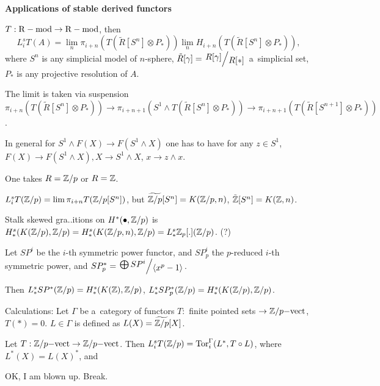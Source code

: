 



    {\bf Applications of stable derived functors}
    
    \begin{theorem}
        $T:\mathrm{R-mod} \to \mathrm{R-mod}$, then 
        $$L_i^sT(A) = \lim_n \pi_{i+n}(T(\tilde{R}[S^n] \otimes P_\ast))
        \lim_n H_{i+n}(T(\tilde{R}[S^n] \otimes P_\ast)),$$
        where $S^n$ is any simplicial model of $n$-sphere,
        $\tilde{R}[\gamma] = \bigslant{R[\gamma]}{R[\ast]}$ a~simplicial set,
        $P_\ast$ is any projective resolution of $A$.
        
        The limit is taken via suspension
        $\pi_{i+n}(T(\tilde{R}[S^n] \otimes P_\ast)) 
        \to \pi_{i+n+1}(S^1 \wedge T(\tilde{R}[S^n] \otimes P_\ast))
        \to \pi_{i+n+1}(T(\tilde{R}[S^{n+1}] \otimes P_\ast))$.
    \end{theorem}
        
    In general for $S^1 \wedge F(X) \to F(S^1 \wedge X)$
    one has to have for any $z \in S^1$,
    $F(X) \to F(S^1 \wedge X), X \to S^1 \wedge X$, $x \to z \wedge x$.
    
    One takes $R = {\mathbb{Z}} / p$ or $R = {\mathbb{Z}}$.
    
    $L_i^sT({\mathbb{Z}}/p) = \lim \pi_{i+n} T({\mathbb{Z}}/p [S^n])$,
    but $\widetilde{{\mathbb{Z}}/p}[S^n] = K({\mathbb{Z}}/p,n)$,
    $\tilde{{\mathbb{Z}}}[S^n] = K({\mathbb{Z}}, n)$.
    
    Stalk skewed gra..itions on $H^\ast(\bullet, {\mathbb{Z}}/p)$
    is $H_\ast^s(K({\mathbb{Z}}/p),{\mathbb{Z}}/p) 
    = H_\ast^s(K({\mathbb{Z}}/p,n),{\mathbb{Z}}/p)
    = L_\ast^s {\mathbb{Z}}_p[.]({\mathbb{Z}}/p)$. (?)
    
    \begin{theorem}
        Let $SP^i$ be the $i$-th symmetric power functor,
        and $SP^i_p$ the $p$-reduced $i$-th symmetric power,
        and $SP^\ast_p = \bigslant{\bigoplus SP^i}{\langle x^p - 1 \rangle}$.
        
        Then $L_\ast^s SP^\ast({\mathbb{Z}}/p) = H_\ast^s(K({\mathbb{Z}}),{\mathbb{Z}}/p)$,
        $L_\ast^s SP_p^\ast({\mathbb{Z}}/p) = H_\ast^s(K({\mathbb{Z}}/p),{\mathbb{Z}}/p)$.
    \end{theorem}
    
    Calculations: Let $\Gamma$ be a~category of functors 
    $T:$ finite pointed sets $\to {\mathbb{Z}}/p{\mathrm{-vect}}$,
    $T(\ast)=0$. 
    $L \in \Gamma$ is defined as $L(X) = \widetilde{{\mathbb{Z}}/p}[X]$.
    
    \begin{lemma}
        Let $T:{\mathbb{Z}}/p{\mathrm{-vect}} \to {\mathbb{Z}}/p{\mathrm{-vect}}$.
        Then $L_i^sT({\mathbb{Z}}/p) = \operatorname{Tor}_i^\Gamma(L^\ast,T\circ L)$,
        where $L^\ast(X) = L(X)^\ast$, and
    \end{lemma}
    
    OK, I am blown up. Break.




 
 